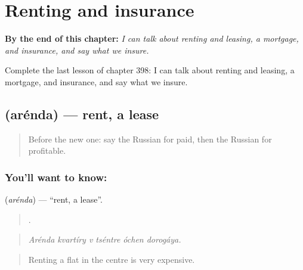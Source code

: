 
\chapter{Renting and insurance}
\label{ch:ru-renting-and-insurance}

\begin{chapteropening}
\textbf{By the end of this chapter:} \emph{I can talk about renting and leasing, a mortgage, and insurance, and say what we insure.}

Complete the last lesson of chapter 398: I can talk about renting and leasing, a mortgage, and insurance, and say what we insure.
\end{chapteropening}

\section[\texorpdfstring{\ru{аренда} (arénda)}{аренда (arénda)}]{ (arénda) — rent, a lease}

\label{lesson:RU-C398-arenda}



\begin{quote}
Before the new one: say the Russian for paid, then the Russian for profitable.
\end{quote}

\subsection*{You'll want to know: }
\textbf{} (\emph{arénda}) — \textquotedblleft{}rent, a lease\textquotedblright{}.

\begin{quote}
     .
\end{quote}

\begin{quote}
\emph{Arénda kvartíry v tséntre óchen dorogáya.}
\end{quote}

\begin{quote}
Renting a flat in the centre is very expensive.
\end{quote}

